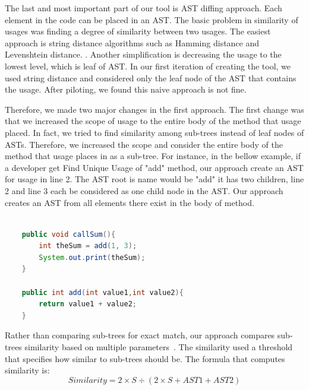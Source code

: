 \documentclass[conference]{IEEEtran}
\begin{document}
The last and most important part of our tool is AST diffing approach. Each element in the code can be placed in an AST. The basic problem in similarity of usages was finding a degree of similarity between two usages. The easiest approach is string distance algorithms such as Hamming distance and Levenshtein distance. . Another simplification is decreasing the usage to the lowest level, which is leaf of AST. In our first iteration of creating the tool, we used string distance and considered only the leaf node of the AST that contains the usage. After piloting, we found this naive approach is not fine.\par

Therefore, we made two major changes in the first approach. The first change was that we increased the scope of usage to the entire body of the method that usage placed. In fact, we tried to find similarity among sub-trees instead of leaf nodes of ASTs. Therefore, we increased the scope and consider the entire body of the method that usage places in as a sub-tree. For instance, in the bellow example, if a developer get Find Unique Usage of "add" method, our approach create an AST for usage in line 2. The AST root is name would be "add" it has two children, line 2 and line 3 each be considered as one child node in the AST. Our approach creates  an AST from all elements there exist in the body of method. \par

\begin{lstlisting}[language=Java, caption=AST exmple is shown. Each AST created based on all elements in the body of method.]

    public void callSum(){
        int theSum = add(1, 3);
        System.out.print(theSum);
    }

    public int add(int value1,int value2){
        return value1 + value2;
    }
\end{lstlisting}

Rather than comparing sub-trees for exact match, our approach compares sub-trees similarity based on multiple parameters~\cite{baxter1998clone}. The similarity used a threshold that specifies how similar to sub-trees should be. The formula that computes similarity is:
\begin{equation}
Similarity = 2 \times S  \div (2  \times S  + AST1 + AST2)
\label{equation1}
\end{equation}
\end{document}
